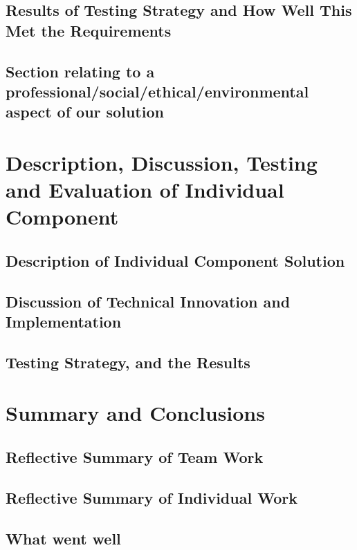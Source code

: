 \documentclass[a4paper]{report}
\begin{document}
\section{Results of Testing Strategy and How Well This Met the Requirements}
\section{Section relating to a professional/social/ethical/environmental 
        aspect of our solution} %

\chapter*{Description, Discussion, Testing and Evaluation of 
            Individual Component}
\section{Description of Individual Component Solution}
\section{Discussion of Technical Innovation and Implementation}
\section{Testing Strategy, and the Results}

\chapter*{Summary and Conclusions}
\section{Reflective Summary of Team Work}
\section{Reflective Summary of Individual Work}
\section{What went well}
\end{document}
